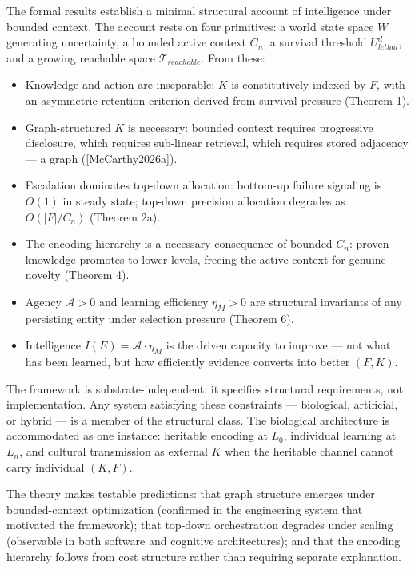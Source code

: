 \documentclass[
]{article}
\providecommand{\tightlist}{%
  \setlength{\itemsep}{0pt}\setlength{\parskip}{0pt}}
\begin{document}
The formal results establish a minimal structural account of
intelligence under bounded context. The account rests on four
primitives: a world state space \(W\) generating uncertainty, a bounded
active context \(C_n\), a survival threshold \(U_{lethal}^d\), and a
growing reachable space \(\mathcal{T}_{reachable}\). From these:

\begin{itemize}
\tightlist
\item
  Knowledge and action are inseparable: \(K\) is constitutively indexed
  by \(F\), with an asymmetric retention criterion derived from survival
  pressure (Theorem 1).
\item
  Graph-structured \(K\) is necessary: bounded context requires
  progressive disclosure, which requires sub-linear retrieval, which
  requires stored adjacency --- a graph ({[}McCarthy2026a{]}).
\item
  Escalation dominates top-down allocation: bottom-up failure signaling
  is \(O(1)\) in steady state; top-down precision allocation degrades as
  \(O(|F|/C_n)\) (Theorem 2a).
\item
  The encoding hierarchy is a necessary consequence of bounded \(C_n\):
  proven knowledge promotes to lower levels, freeing the active context
  for genuine novelty (Theorem 4).
\item
  Agency \(\mathcal{A} > 0\) and learning efficiency \(\eta_M > 0\) are
  structural invariants of any persisting entity under selection
  pressure (Theorem 6).
\item
  Intelligence \(I(E) = \mathcal{A} \cdot \eta_M\) is the driven
  capacity to improve --- not what has been learned, but how efficiently
  evidence converts into better \((F, K)\).
\end{itemize}

The framework is substrate-independent: it specifies structural
requirements, not implementation. Any system satisfying these
constraints --- biological, artificial, or hybrid --- is a member of the
structural class. The biological architecture is accommodated as one
instance: heritable encoding at \(L_0\), individual learning at
\(L_n\), and cultural transmission as external \(K\) when the heritable
channel cannot carry individual \((K, F)\).

The theory makes testable predictions: that graph structure emerges
under bounded-context optimization (confirmed in the engineering system
that motivated the framework); that top-down orchestration degrades
under scaling (observable in both software and cognitive architectures);
and that the encoding hierarchy follows from cost structure rather than
requiring separate explanation.
\end{document}
